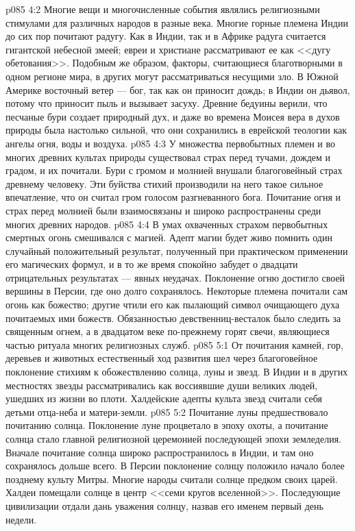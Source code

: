 \vs p085 4:2 Многие вещи и многочисленные события являлись религиозными стимулами для различных народов в разные века. Многие горные племена Индии до сих пор почитают радугу. Как в Индии, так и в Африке радуга считается гигантской небесной змеей; евреи и христиане рассматривают ее как <<дугу обетования>>. Подобным же образом, факторы, считающиеся благотворными в одном регионе мира, в других могут рассматриваться несущими зло. В Южной Америке восточный ветер --- бог, так как он приносит дождь; в Индии он дьявол, потому что приносит пыль и вызывает засуху. Древние бедуины верили, что песчаные бури создает природный дух, и даже во времена Моисея вера в духов природы была настолько сильной, что они сохранились в еврейской теологии как ангелы огня, воды и воздуха.
\vs p085 4:3 У множества первобытных племен и во многих древних культах природы существовал страх перед тучами, дождем и градом, и их почитали. Бури с громом и молнией внушали благоговейный страх древнему человеку. Эти буйства стихий производили на него такое сильное впечатление, что он считал гром голосом разгневанного бога. Почитание огня и страх перед молнией были взаимосвязаны и широко распространены среди многих древних народов.
\vs p085 4:4 В умах охваченных страхом первобытных смертных огонь смешивался с магией. Адепт магии будет живо помнить один случайный положительный результат, полученный при практическом применении его магических формул, и в то же время спокойно забудет о двадцати отрицательных результатах --- явных неудачах. Поклонение огню достигло своей вершины в Персии, где оно долго сохранялось. Некоторые племена почитали сам огонь как божество; другие чтили его как пылающий символ очищающего духа почитаемых ими божеств. Обязанностью девственниц\hyp{}весталок было следить за священным огнем, а в двадцатом веке по\hyp{}прежнему горят свечи, являющиеся частью ритуала многих религиозных служб.
\vs p085 5:1 От почитания камней, гор, деревьев и животных естественный ход развития шел через благоговейное поклонение стихиям к обожествлению солнца, луны и звезд. В Индии и в других местностях звезды рассматривались как воссиявшие души великих людей, ушедших из жизни во плоти. Халдейские адепты культа звезд считали себя детьми отца\hyp{}неба и матери\hyp{}земли.
\vs p085 5:2 Почитание луны предшествовало почитанию солнца. Поклонение луне процветало в эпоху охоты, а почитание солнца стало главной религиозной церемонией последующей эпохи земледелия. Вначале почитание солнца широко распространилось в Индии, и там оно сохранялось дольше всего. В Персии поклонение солнцу положило начало более позднему культу Митры. Многие народы считали солнце предком своих царей. Халдеи помещали солнце в центр <<семи кругов вселенной>>. Последующие цивилизации отдали дань уважения солнцу, назвав его именем первый день недели.
